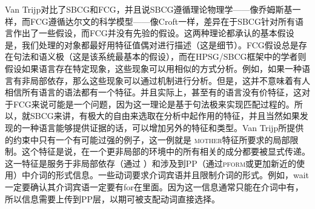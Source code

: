 Van Trijp对比了SBCG和FCG，并且说SBCG遵循理论物理学——像乔姆斯基一样，而FCG遵循达尔文的科学模型——像Croft一样，差异在于SBCG针对所有语言作出了一些假设，而FCG并没有先验的假设。这两种理论都承认的基本假设是，我们处理的对象都最好用特征值偶对进行描述（这是细节）。FCG假设总是存在句法和语义极（这是该系统最基本的假设），而在HPSG/SBCG框架中的学者则假设如果语言存在特定现象，这些现象可以用相似的方式分析。例如，如果一种语言有非局部依存，那么这些现象可以通过\slaschc 机制进行分析。但是，这并不意味着有人相信所有语言的语法都有一个\slaschc 特征。并且实际上，甚至有的语言没有价特征\citep{KM2010a-u}，这对于FCG来说可能是一个问题，因为这一理论是基于句法极来实现匹配过程的。所以，就SBCG来讲，有极大的自由来选取在分析中起作用的特征，并且当然如果发现的一种语言能够提供证据的话，可以增加另外的特征和类型。Van Trijp所提供的约束中只有一个有可能过强的例子，这一例就是 \textsc{mother}特征所要求的局部限制。这个特征是说，在一个更非局部的环境中的所有相关的成分都要被显式传递。这一特征是服务于非局部依存（通过 \slaschc）和涉及到PP（通过\textsc{pform}或更加新近的使用\formc）中介词的形式信息。一些动词要求介词宾语并且限制介词的形式。例如，wait一定要确认其介词宾语一定要有for在里面。因为这一信息通常只能在介词中有，所以信息需要上传到PP层，以期可被支配动词直接选择。
